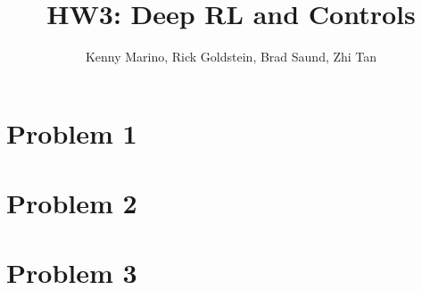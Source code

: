 \documentclass[]{scrartcl}
\title{HW3: Deep RL and Controls}
\author{Kenny Marino, Rick Goldstein, Brad Saund, Zhi Tan}
\begin{document}
\maketitle

\section{Problem 1}
\section{Problem 2}
\section{Problem 3}
\end{document}
